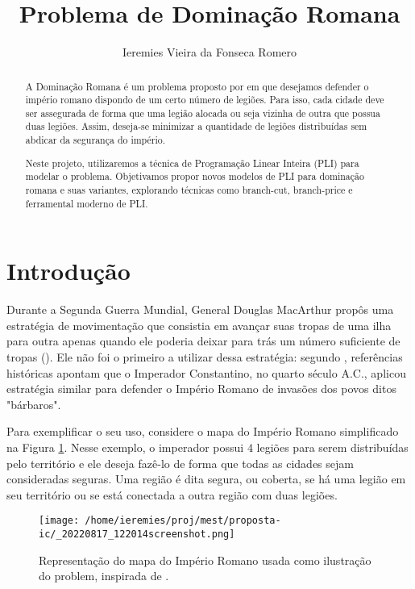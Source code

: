 \documentclass[11pt]{article}
\author{Ieremies Vieira da Fonseca Romero}
\date{}
\title{Problema de Dominação Romana}
\begin{document}
\maketitle
\begin{abstract}
A Dominação Romana é um problema proposto por \textcite{Stewart1999DefendRomanEmpire} em que desejamos defender o império romano dispondo de um certo número de legiões.
Para isso, cada cidade deve ser assegurada de forma que uma legião alocada ou seja vizinha de outra que possua duas legiões.
Assim, deseja-se minimizar a quantidade de legiões distribuídas sem abdicar da segurança do império.

Neste projeto, utilizaremos a técnica de Programação Linear Inteira (PLI) para modelar o problema.
Objetivamos propor novos modelos de PLI para dominação romana e suas variantes, explorando técnicas como branch-cut, branch-price e ferramental moderno de PLI.
\end{abstract}

\section{Introdução}
\label{sec:orge42ade3}
Durante a Segunda Guerra Mundial, General Douglas MacArthur propôs uma estratégia de movimentação que consistia em avançar suas tropas de uma ilha para outra apenas quando ele poderia deixar para trás um número suficiente de tropas (\autocite{Stewart1999DefendRomanEmpire}). 
Ele não foi o primeiro a utilizar dessa estratégia: segundo \textcite{Stewart1999DefendRomanEmpire}, referências históricas apontam que o Imperador Constantino, no quarto século A.C., aplicou estratégia similar para defender o Império Romano de invasões dos povos ditos "bárbaros".

Para exemplificar o seu uso, considere o mapa do Império Romano simplificado na Figura \ref{fig:mapa}.
Nesse exemplo, o imperador possui \(4\) legiões para serem distribuídas pelo território e ele deseja fazê-lo de forma que todas as cidades sejam consideradas seguras.
Uma região é dita segura, ou coberta, se há uma legião em seu território ou se está conectada a outra região com duas legiões.

\begin{figure}[htbp]
\centering
\texttt{[image: /home/ieremies/proj/mest/proposta-ic/\_20220817\_122014screenshot.png]}
\caption{\label{fig:mapa}Representação do mapa do Império Romano usada como ilustração do problem, inspirada de \textcite{Stewart1999DefendRomanEmpire}.}
\end{figure}
\end{document}
